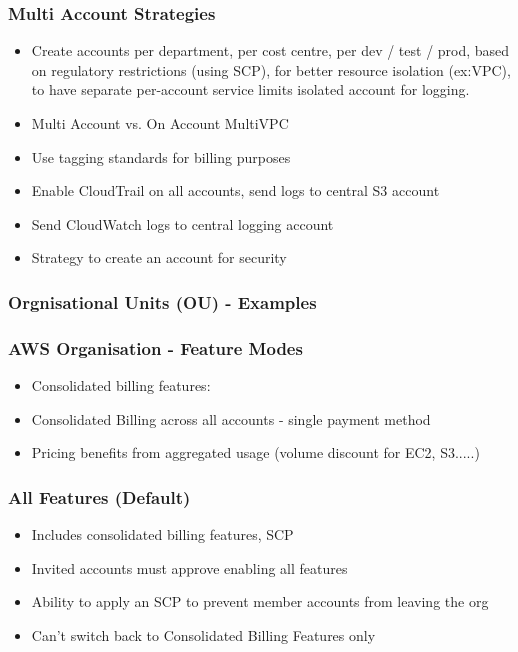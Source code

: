 \subsubsection{Multi Account Strategies}
\begin{itemize}
    \item Create accounts per department, per cost centre, per dev / test / prod, based on regulatory restrictions (using SCP), for better resource isolation (ex:VPC), to have separate per-account service limits isolated account for logging.
    \item Multi Account vs. On Account MultiVPC
    \item Use tagging standards for billing purposes
    \item Enable CloudTrail on all accounts, send logs to central S3 account
    \item Send CloudWatch logs to central logging account
    \item Strategy to create an account for security
\end{itemize}

\subsubsection{Orgnisational Units (OU) - Examples}

\subsubsection{AWS Organisation - Feature Modes}
\begin{itemize}
    \item Consolidated billing features:
    \item Consolidated Billing across all accounts - single payment method
    \item Pricing benefits from aggregated usage (volume discount for EC2, S3.....)
\end{itemize}

\subsubsection{All Features (Default)}
\begin{itemize}
    \item Includes consolidated billing features, SCP
    \item Invited accounts must approve enabling all features
    \item Ability to apply an SCP to prevent member accounts from leaving the org
    \item Can't switch back to Consolidated Billing Features only
\end{itemize}

